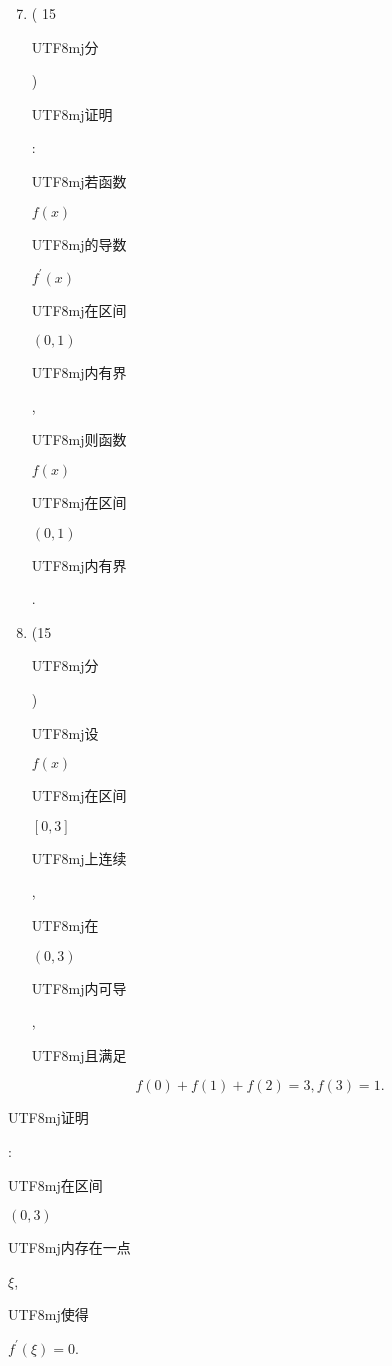 \documentclass[10pt]{article}
\begin{document}
\begin{enumerate}
  \setcounter{enumi}{6}
  \item ( 15 \begin{CJK}{UTF8}{mj}分\end{CJK}) \begin{CJK}{UTF8}{mj}证明\end{CJK}: \begin{CJK}{UTF8}{mj}若函数\end{CJK} $f(x)$ \begin{CJK}{UTF8}{mj}的导数\end{CJK} $f^{\prime}(x)$ \begin{CJK}{UTF8}{mj}在区间\end{CJK} $(0,1)$ \begin{CJK}{UTF8}{mj}内有界\end{CJK}, \begin{CJK}{UTF8}{mj}则函数\end{CJK} $f(x)$ \begin{CJK}{UTF8}{mj}在区间\end{CJK} $(0,1)$ \begin{CJK}{UTF8}{mj}内有界\end{CJK}.

  \item (15 \begin{CJK}{UTF8}{mj}分\end{CJK}) \begin{CJK}{UTF8}{mj}设\end{CJK} $f(x)$ \begin{CJK}{UTF8}{mj}在区间\end{CJK} $[0,3]$ \begin{CJK}{UTF8}{mj}上连续\end{CJK}, \begin{CJK}{UTF8}{mj}在\end{CJK} $(0,3)$ \begin{CJK}{UTF8}{mj}内可导\end{CJK}, \begin{CJK}{UTF8}{mj}且满足\end{CJK}

\end{enumerate}
$$
f(0)+f(1)+f(2)=3, f(3)=1 .
$$
\begin{CJK}{UTF8}{mj}证明\end{CJK}: \begin{CJK}{UTF8}{mj}在区间\end{CJK} $(0,3)$ \begin{CJK}{UTF8}{mj}内存在一点\end{CJK} $\xi$, \begin{CJK}{UTF8}{mj}使得\end{CJK} $f^{\prime}(\xi)=0$.
\end{document}
